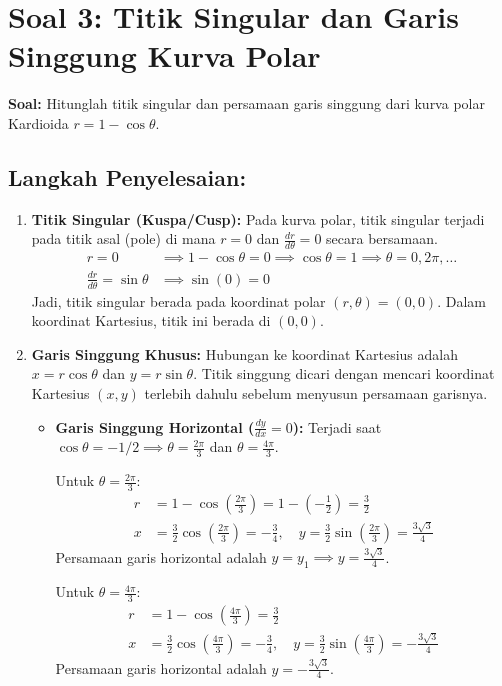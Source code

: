 \documentclass[11pt,a4paper]{article}
\begin{document}
\newpage

\section*{Soal 3: Titik Singular dan Garis Singgung Kurva Polar}
\textbf{Soal:} Hitunglah titik singular dan persamaan garis singgung dari kurva polar Kardioida $r = 1 - \cos\theta$.

\subsection*{Langkah Penyelesaian:}
\begin{enumerate}
  \item \textbf{Titik Singular (Kuspa/Cusp):}
  Pada kurva polar, titik singular terjadi pada titik asal (pole) di mana $r = 0$ dan $\frac{dr}{d\theta} = 0$ secara bersamaan.
  \begin{align*}
    r = 0 &\implies 1 - \cos\theta = 0 \implies \cos\theta = 1 \implies \theta = 0, 2\pi, \dots \\
    \frac{dr}{d\theta} = \sin\theta &\implies \sin(0) = 0
  \end{align*}
  Jadi, titik singular berada pada koordinat polar \textbf{$(r, \theta) = (0,0)$}. Dalam koordinat Kartesius, titik ini berada di \textbf{$(0,0)$}.

  \item \textbf{Garis Singgung Khusus:}
  Hubungan ke koordinat Kartesius adalah $x = r\cos\theta$ dan $y = r\sin\theta$. Titik singgung dicari dengan mencari koordinat Kartesius $(x,y)$ terlebih dahulu sebelum menyusun persamaan garisnya.
  
  \begin{itemize}
    \item \textbf{Garis Singgung Horizontal ($\frac{dy}{dx} = 0$):} 
    Terjadi saat $\cos\theta = -1/2 \implies \theta = \frac{2\pi}{3}$ dan $\theta = \frac{4\pi}{3}$.
    
    Untuk $\theta = \frac{2\pi}{3}$:
    \begin{align*}
      r &= 1 - \cos\left(\frac{2\pi}{3}\right) = 1 - \left(-\frac{1}{2}\right) = \frac{3}{2} \\
      x &= \frac{3}{2}\cos\left(\frac{2\pi}{3}\right) = -\frac{3}{4}, \quad y = \frac{3}{2}\sin\left(\frac{2\pi}{3}\right) = \frac{3\sqrt{3}}{4}
    \end{align*}
    Persamaan garis horizontal adalah $y = y_1 \implies y = \frac{3\sqrt{3}}{4}$.
    
    Untuk $\theta = \frac{4\pi}{3}$:
    \begin{align*}
      r &= 1 - \cos\left(\frac{4\pi}{3}\right) = \frac{3}{2} \\
      x &= \frac{3}{2}\cos\left(\frac{4\pi}{3}\right) = -\frac{3}{4}, \quad y = \frac{3}{2}\sin\left(\frac{4\pi}{3}\right) = -\frac{3\sqrt{3}}{4}
    \end{align*}
    Persamaan garis horizontal adalah $y = -\frac{3\sqrt{3}}{4}$.
    

\end{itemize}
\end{enumerate}
\end{document}
